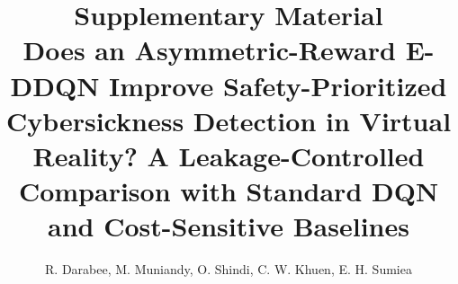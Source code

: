 \documentclass[10pt,a4paper]{article}
\title{Supplementary Material\\[2mm]\large Does an Asymmetric-Reward E-DDQN Improve Safety-Prioritized Cybersickness Detection in Virtual Reality? A Leakage-Controlled Comparison with Standard DQN and Cost-Sensitive Baselines}
\author{R. Darabee, M. Muniandy, O. Shindi, C. W. Khuen, E. H. Sumiea}
\date{}
\begin{document}
\sloppy
\maketitle
\tableofcontents










\end{document}
